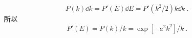 
\begin{equation}
P(k)\dd{k} = P'(E)\dd{E} = P'(k^2/2)k\dd{k}~.
\end{equation}
所以
\begin{equation}
P'(E) = P(k)/k = \exp[-a^2 k^2]/k~.
\end{equation}
